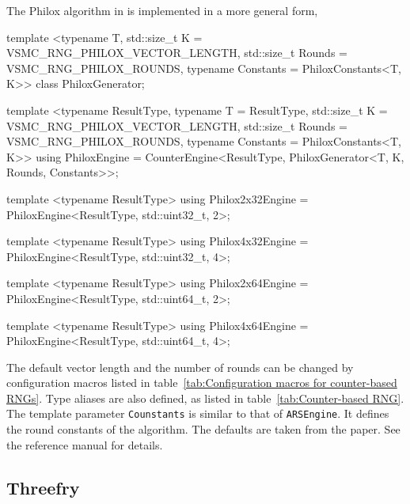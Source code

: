 The Philox algorithm in \textcite{Salmon:2011um} is implemented in a more
general form,
\begin{cppcode}
  template <typename T, std::size_t K = VSMC_RNG_PHILOX_VECTOR_LENGTH,
      std::size_t Rounds = VSMC_RNG_PHILOX_ROUNDS,
      typename Constants = PhiloxConstants<T, K>>
  class PhiloxGenerator;

  template <typename ResultType, typename T = ResultType,
      std::size_t K = VSMC_RNG_PHILOX_VECTOR_LENGTH,
      std::size_t Rounds = VSMC_RNG_PHILOX_ROUNDS,
      typename Constants = PhiloxConstants<T, K>>
  using PhiloxEngine =
      CounterEngine<ResultType, PhiloxGenerator<T, K, Rounds, Constants>>;

  template <typename ResultType>
  using Philox2x32Engine = PhiloxEngine<ResultType, std::uint32_t, 2>;

  template <typename ResultType>
  using Philox4x32Engine = PhiloxEngine<ResultType, std::uint32_t, 4>;

  template <typename ResultType>
  using Philox2x64Engine = PhiloxEngine<ResultType, std::uint64_t, 2>;

  template <typename ResultType>
  using Philox4x64Engine = PhiloxEngine<ResultType, std::uint64_t, 4>;
\end{cppcode}
The default vector length and the number of rounds can be changed by
configuration macros listed in table~\ref{tab:Configuration macros for
  counter-based RNGs}. Type aliases are also defined, as listed in
table~\ref{tab:Counter-based RNG}. The template parameter \verb|Counstants| is
similar to that of \verb|ARSEngine|. It defines the round constants of the
algorithm. The defaults are taken from the paper. See the reference manual for
details.

\subsection{Threefry}
\label{sub:Threefry}

